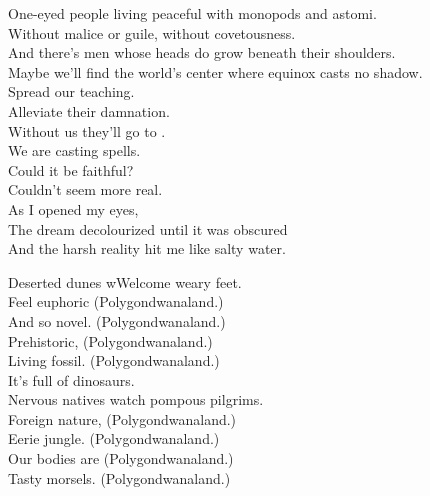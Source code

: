 
One-eyed people living peaceful with monopods and astomi. \\
Without malice or guile, without covetousness. \\

And there's men whose heads do grow beneath their shoulders. \\
Maybe we'll find the world's center where equinox casts no shadow. \\
Spread our teaching. \\
Alleviate their damnation. \\

Without us they'll go to . \\
We are casting spells. \\

Could it be faithful? \\
Couldn't seem more real. \\
As I opened my eyes, \\
The dream decolourized until it was obscured \\
And the harsh reality hit me like salty water. \\





Deserted dunes wWelcome weary feet. \\
Feel euphoric (Polygondwanaland.) \\
And so novel. (Polygondwanaland.) \\
Prehistoric, (Polygondwanaland.) \\
Living fossil. (Polygondwanaland.) \\

It's full of dinosaurs. \\

Nervous natives watch pompous pilgrims. \\
Foreign nature, (Polygondwanaland.) \\
Eerie jungle. (Polygondwanaland.) \\
Our bodies are (Polygondwanaland.) \\
Tasty morsels. (Polygondwanaland.) \\

